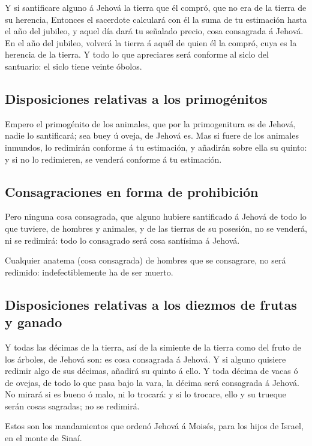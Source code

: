  Y si santificare alguno á Jehová la tierra que él
compró, que no era de la tierra de su herencia,  Entonces
el sacerdote calculará con él la suma de tu estimación hasta el año del
jubileo, y aquel día dará tu señalado precio, cosa consagrada á Jehová.
 En el año del jubileo, volverá la tierra á aquél de
quien él la compró, cuya es la herencia de la tierra.  Y
todo lo que apreciares será conforme al siclo del santuario: el siclo
tiene veinte óbolos.

\hypertarget{disposiciones-relativas-a-los-primoguxe9nitos}{%
\subsection{Disposiciones relativas a los
primogénitos}\label{disposiciones-relativas-a-los-primoguxe9nitos}}

 Empero el primogénito de los animales, que por la
primogenitura es de Jehová, nadie lo santificará; sea buey ú oveja, de
Jehová es.  Mas si fuere de los animales inmundos, lo
redimirán conforme á tu estimación, y añadirán sobre ella su quinto: y
si no lo redimieren, se venderá conforme á tu estimación.

\hypertarget{consagraciones-en-forma-de-prohibiciuxf3n}{%
\subsection{Consagraciones en forma de
prohibición}\label{consagraciones-en-forma-de-prohibiciuxf3n}}

 Pero ninguna cosa consagrada, que alguno hubiere
santificado á Jehová de todo lo que tuviere, de hombres y animales, y de
las tierras de su posesión, no se venderá, ni se redimirá: todo lo
consagrado será cosa santísima á Jehová.

 Cualquier anatema (cosa consagrada) de hombres que se
consagrare, no será redimido: indefectiblemente ha de ser muerto.

\hypertarget{disposiciones-relativas-a-los-diezmos-de-frutas-y-ganado}{%
\subsection{Disposiciones relativas a los diezmos de frutas y
ganado}\label{disposiciones-relativas-a-los-diezmos-de-frutas-y-ganado}}

 Y todas las décimas de la tierra, así de la simiente de
la tierra como del fruto de los árboles, de Jehová son: es cosa
consagrada á Jehová.  Y si alguno quisiere redimir algo
de sus décimas, añadirá su quinto á ello.  Y toda décima
de vacas ó de ovejas, de todo lo que pasa bajo la vara, la décima será
consagrada á Jehová.  No mirará si es bueno ó malo, ni lo
trocará: y si lo trocare, ello y su trueque serán cosas sagradas; no se
redimirá.

 Estos son los mandamientos que ordenó Jehová á Moisés,
para los hijos de Israel, en el monte de Sinaí.
